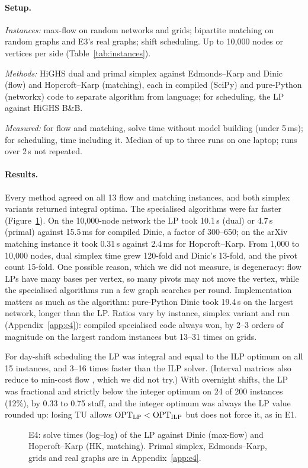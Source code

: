 \paragraph{Setup.}
\begin{setup}
  \item \emph{Instances:} max-flow on random networks and grids; bipartite matching on random graphs and E3's real graphs; shift scheduling. Up to 10,000 nodes or vertices per side (Table~\ref{tab:instances}).
  \item \emph{Methods:} HiGHS dual and primal simplex against Edmonds--Karp \cite{edmondskarp1972} and Dinic \cite{dinitz1970} (flow) and Hopcroft--Karp \cite{hopcroft1973} (matching), each in compiled (SciPy) and pure-Python (networkx) code to separate algorithm from language; for scheduling, the LP against HiGHS B\&B.
  \item \emph{Measured:} for flow and matching, solve time without model building (under 5\,ms); for scheduling, time including it. Median of up to three runs on one laptop; runs over 2\,s not repeated.
\end{setup}

\paragraph{Results.} Every method agreed on all 13 flow and matching instances, and both simplex variants returned integral optima. The specialised algorithms were far faster (Figure~\ref{fig:e4}). On the 10,000-node network the LP took 10.1\,s (dual) or 4.7\,s (primal) against 15.5\,ms for compiled Dinic, a factor of 300--650; on the arXiv matching instance it took 0.31\,s against 2.4\,ms for Hopcroft--Karp. From 1,000 to 10,000 nodes, dual simplex time grew 120-fold and Dinic's 13-fold, and the pivot count 15-fold. One possible reason, which we did not measure, is degeneracy: flow LPs have many bases per vertex, so many pivots may not move the vertex, while the specialised algorithms run a few graph searches per round. Implementation matters as much as the algorithm: pure-Python Dinic took 19.4\,s on the largest network, longer than the LP. Ratios vary by instance, simplex variant and run (Appendix~\ref{app:e4}): compiled specialised code always won, by 2--3 orders of magnitude on the largest random instances but 13--31 times on grids.

For day-shift scheduling the LP was integral and equal to the ILP optimum on all 15 instances, and 3--16 times faster than the ILP solver. (Interval matrices also reduce to min-cost flow \cite{veinott1962a,veinott1962b}, which we did not try.) With overnight shifts, the LP was fractional and strictly below the integer optimum on 24 of 200 instances (12\%), by 0.33 to 0.75 staff, and the integer optimum was always the LP value rounded up: losing TU allows $\mathrm{OPT}_{\mathrm{LP}}<\mathrm{OPT}_{\mathrm{ILP}}$ but does not force it, as in E1.

\begin{figure}[H]
  \centering
  
  \caption{E4: solve times (log--log) of the LP against Dinic (max-flow) and Hopcroft--Karp (HK, matching). Primal simplex, Edmonds--Karp, grids and real graphs are in Appendix~\ref{app:e4}.}
  \label{fig:e4}
\end{figure}
